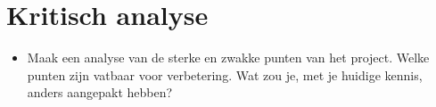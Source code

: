 \documentclass[tt1]{penoverslag}
\begin{document}
\section{Kritisch analyse}
\begin{itemize}
\item Maak een analyse van de sterke en zwakke punten van het project. Welke punten zijn vatbaar voor verbetering. Wat zou je, met je huidige kennis, anders aangepakt hebben?
\end{itemize}



\newpage


\end{document}
